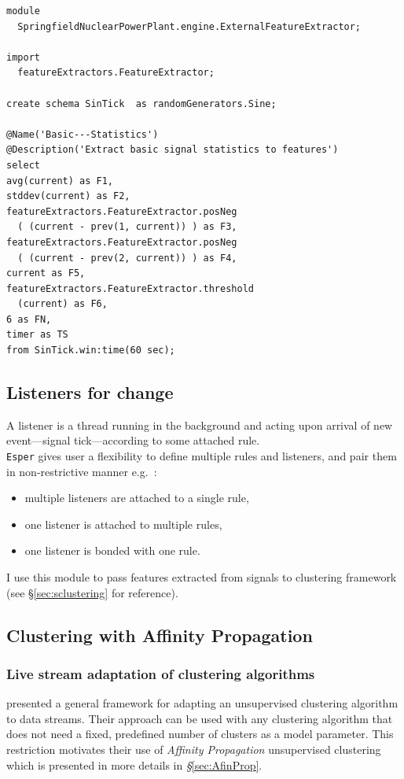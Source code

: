 \documentclass[11pt, letterpaper]{article}            %
\begin{document}
\vspace{1em}
\begin{lstlisting}
module
  SpringfieldNuclearPowerPlant.engine.ExternalFeatureExtractor;

import
  featureExtractors.FeatureExtractor;

create schema SinTick  as randomGenerators.Sine;

@Name('Basic---Statistics')
@Description('Extract basic signal statistics to features')
select
avg(current) as F1,
stddev(current) as F2,
featureExtractors.FeatureExtractor.posNeg
  ( (current - prev(1, current)) ) as F3,
featureExtractors.FeatureExtractor.posNeg
  ( (current - prev(2, current)) ) as F4,
current as F5,
featureExtractors.FeatureExtractor.threshold
  (current) as F6,
6 as FN,
timer as TS
from SinTick.win:time(60 sec);
\end{lstlisting}


\subsection{Listeners for change\label{sec:listeners}}
A listener is a thread running in the background and acting upon arrival of new event---signal tick---according to some attached rule.\\
\texttt{Esper} gives user a flexibility to define multiple rules and listeners, and pair them in non-restrictive manner e.g.\ :
\begin{itemize}
\item multiple listeners are attached to a single rule,
\item one listener is attached to multiple rules,
\item one listener is bonded with one rule.
\end{itemize}

\noindent I use this module to pass features extracted from signals to clustering framework (see §\ref{sec:sclustering} for reference).

\subsection{Clustering with Affinity Propagation\label{sec:sclustering}}

\subsubsection{Live stream adaptation of clustering algorithms\label{sec:livestream}}
\citep{zhang2013data} presented a general framework for adapting an unsupervised clustering algorithm to data streams. Their approach can be used with any clustering algorithm that does not need a fixed, predefined number of clusters as a model parameter. This restriction motivates their use of \emph{Affinity Propagation} unsupervised clustering which is presented in more details in \emph{§}\ref{sec:AfinProp}.\\
\end{document}
